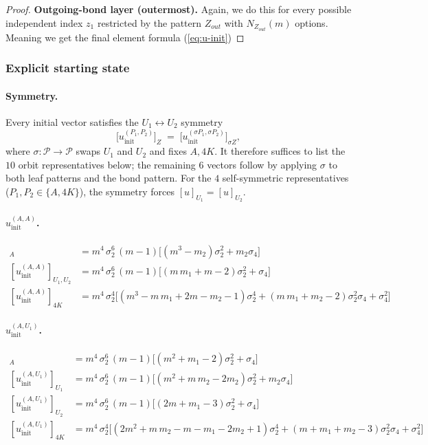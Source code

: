 \documentclass[12pt,a4paper]{article}
\begin{document}
\begin{proof}
\smallskip\noindent\textbf{Outgoing-bond layer (outermost).} 
Again, we do this for every possible independent index $z_{1}$ restricted by the pattern $Z_{out}$ with $N_{Z_{out}}(m)$ options. Meaning we get the final element formula (\ref{eq:u-init})
\end{proof}
\subsubsection{Explicit starting state}
\paragraph{Symmetry.} 
Every initial vector satisfies the $U_{1} \leftrightarrow U_{2}$ symmetry
\[
\bigl[u^{(P_{1}, P_{2})}_{\mathrm{init}}\bigr]_{Z}
\;=\;
\bigl[u^{(\sigma P_{1}, \sigma P_{2})}_{\mathrm{init}}\bigr]_{\sigma Z},
\]
where $\sigma : \mathcal{P} \to \mathcal{P}$ swaps $U_{1}$ and $U_{2}$ and fixes $A, 4K$. 
It therefore suffices to list the $10$ orbit representatives below; the remaining $6$ 
vectors follow by applying $\sigma$ to both leaf patterns and the bond pattern. For the 
$4$ self-symmetric representatives ($P_{1}, P_{2} \in \{A, 4K\}$), the symmetry forces 
$[u]_{U_{1}} = [u]_{U_{2}}$.

\paragraph{$u^{(A, A)}_{\mathrm{init}}$.}
\begin{align*}
[u^{(A, A)}_{\mathrm{init}}]_{A}
  &= m^{4}\,\sigma_{2}^{6}\,(m-1)\bigl[(m^{3} - m_{2})\sigma_{2}^{2} + m_{2}\sigma_{4}\bigr]\\
[u^{(A, A)}_{\mathrm{init}}]_{U_{1}, U_{2}}
  &= m^{4}\,\sigma_{2}^{6}\,(m-1)\bigl[(m\,m_{1} + m - 2)\sigma_{2}^{2} + \sigma_{4}\bigr]\\
[u^{(A, A)}_{\mathrm{init}}]_{4K}
  &= m^{4}\,\sigma_{2}^{4}\bigl[
       (m^{3} - m\,m_{1} + 2m - m_{2} - 1)\sigma_{2}^{4}
       + (m\,m_{1} + m_{2} - 2)\sigma_{2}^{2}\sigma_{4} + \sigma_{4}^{2}\bigr]
\end{align*}

\paragraph{$u^{(A, U_{1})}_{\mathrm{init}}$.}
\begin{align*}
[u^{(A, U_{1})}_{\mathrm{init}}]_{A}
  &= m^{4}\,\sigma_{2}^{6}\,(m-1)\bigl[(m^{2} + m_{1} - 2)\sigma_{2}^{2} + \sigma_{4}\bigr]\\
[u^{(A, U_{1})}_{\mathrm{init}}]_{U_{1}}
  &= m^{4}\,\sigma_{2}^{6}\,(m-1)\bigl[(m^{2} + m\,m_{2} - 2m_{2})\sigma_{2}^{2} + m_{2}\sigma_{4}\bigr]\\
[u^{(A, U_{1})}_{\mathrm{init}}]_{U_{2}}
  &= m^{4}\,\sigma_{2}^{6}\,(m-1)\bigl[(2m + m_{1} - 3)\sigma_{2}^{2} + \sigma_{4}\bigr]\\
[u^{(A, U_{1})}_{\mathrm{init}}]_{4K}
  &= m^{4}\,\sigma_{2}^{4}\bigl[
       (2m^{2} + m\,m_{2} - m - m_{1} - 2m_{2} + 1)\sigma_{2}^{4}
       + (m + m_{1} + m_{2} - 3)\sigma_{2}^{2}\sigma_{4} + \sigma_{4}^{2}\bigr]
\end{align*}
\end{document}

